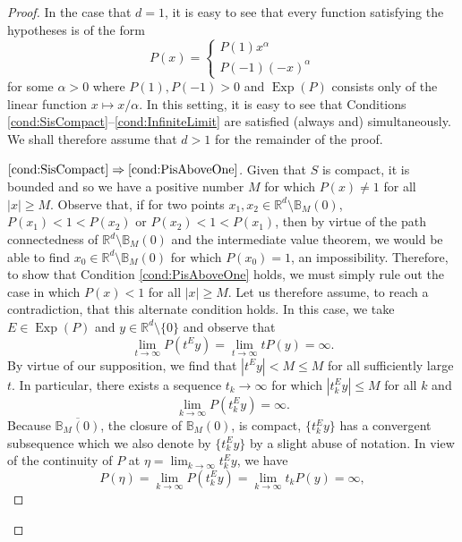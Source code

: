 \documentclass[11pt]{article}
\newcommand*{\myproofname}{Proof}
\newenvironment{subproof}[1][\myproofname]{\begin{proof}[#1]\renewcommand*{\qedsymbol}{$\mathbin{/\mkern-6mu/}$}}{\end{proof}}
\newcommand\Exp{\operatorname{Exp}}
\begin{document}
\begin{proof}
In the case that $d=1$, it is easy to see that every function satisfying the hypotheses is of the form
\begin{equation*}
P(x)=\begin{cases}
P(1)x^\alpha \\
P(-1)(-x)^\alpha
\end{cases}
\end{equation*}
for some $\alpha>0$ where $P(1),P(-1)>0$ and $\Exp(P)$ consists only of the linear function $x\mapsto x/\alpha$. In this setting, it is easy to see that Conditions \ref{cond:SisCompact}--\ref{cond:InfiniteLimit} are satisfied (always and) simultaneously. We shall therefore assume that $d>1$ for the remainder of the proof.

\begin{subproof}[$\ref{cond:SisCompact}\Rightarrow\ref{cond:PisAboveOne}$]
Given that $S$ is compact, it is bounded and so we have a positive number $M$ for which $P(x)\neq 1$ for all $|x|\geq M$. Observe that, if for two points $x_1,x_2\in \mathbb{R}^d\setminus\mathbb{B}_M(0)$, $P(x_1)<1<P(x_2)$ or $P(x_2)<1<P(x_1)$, then by virtue of the path connectedness of $\mathbb{R}^d\setminus\mathbb{B}_M(0)$ and the intermediate value theorem, we would be able to find  $x_0\in\mathbb{R}^d\setminus\mathbb{B}_M(0)$ for which $P(x_0)=1$, an impossibility. Therefore, to show that Condition \ref{cond:PisAboveOne} holds, we must simply rule out the case in which $P(x)<1$ for all $|x|\geq M$. Let us therefore assume, to reach a contradiction, that this alternate condition holds. In this case, we take $E\in\Exp(P)$ and $y\in\mathbb{R}^d\setminus \{0\}$ and observe that
\begin{equation*}
\lim_{t\to\infty}P(t^Ey)=\lim_{t\to\infty}tP(y)=\infty.
\end{equation*}
By virtue of our supposition, we find that $|t^Ey|<M\leq M$ for all sufficiently large $t$. In particular, there exists a sequence $t_k\to\infty$ for which $|t_k^Ey|\leq M$ for all $k$ and 
\begin{equation*}
\lim_{k\to\infty}P(t_k^Ey)=\infty.
\end{equation*}
Because $\overline{\mathbb{B}_M(0)}$, the closure of $\mathbb{B}_M(0)$, is compact, $\{t_k^Ey\}$ has a convergent subsequence which we also denote by $\{t_k^Ey\}$ by a slight abuse of notation. In view of the continuity of $P$ at $\eta=\lim_{k\to\infty}t_k^Ey$, we have
\begin{equation*}
P(\eta)=\lim_{k\to\infty}P(t_k^Ey)=\lim_{k\to\infty}t_kP(y)=\infty,

\end{equation*}
\end{subproof}
\end{proof}
\end{document}
